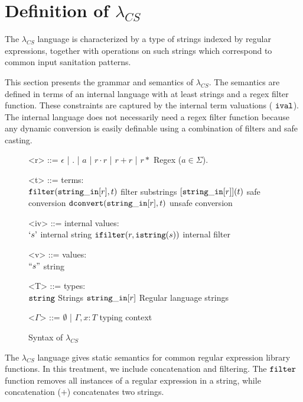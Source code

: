\documentclass[10pt,preprint]{sigplanconf}
\theoremstyle{definition}
\newcommand{\strin}{{\tt string\_in}}
\newcommand{\str}{ {\tt string} }
\newcommand{\istr}{ {\tt istring} }
\newcommand{\dconvert}[2]{ {\tt dconvert}(#1,#2) }
\newcommand{\filter}[2]{ {\tt filter}(#1,#2) }
\newcommand{\ival}{ \ {\tt ival} }
\newcommand{\istrf}[1]{`#1\textrm'} %
\newcommand{\strf}[1]{``#1"}
\newcommand{\lcs}{\lambda_{CS}}
\begin{document}
\section{Definition of $\lcs$}

The $\lcs$ language is characterized by a type of strings indexed by regular
expressions, together with operations on such strings which correspond to common
input sanitation patterns.

This section presents the grammar and semantics of $\lcs$.
The semantics are defined in terms of an internal language with at least strings and a regex filter function.
These constraints are captured by the internal term valuations ($\ival$).
The internal language does not necessarily need a regex filter function because
any dynamic conversion is easily definable using a combination of filters and safe
casting.

%
%
\begin{figure}
\begin{grammar}
<r> ::= $\epsilon$ | $.$ | $a$ | $r \cdot r$ | $r + r$ | $r*$ \hfill Regex ($a \in \Sigma$).

<t> ::= 			\hfill terms: 					\\
$\filter{\strin[r]}{t}$ 		\hfill filter substrings			\alt
$[\strin[r]](t)$ \hfill safe conversion \alt
$\dconvert{\strin[r]}{t}$ \hfill unsafe conversion

<iv> ::= 			\hfill internal values:					\\
$\istrf{s}$				\hfill internal string \alt
${\tt ifilter}(r, \istr(s))$ \hfill internal filter

<v> ::= \hfill values: \\
$\strf{s}$ \hfill string

<T> ::=				\hfill	types:					\\
$\str$  \hfill Strings \alt
$\strin[r]$				\hfill Regular language strings		

<$\Gamma$> ::=	$\emptyset$	 | $\Gamma,x:T$ \hfill typing context
\end{grammar}
\caption{Syntax of $\lcs$}
\label{fig:lcsSyntax}
\end{figure}

The $\lcs$ language gives static semantics for common regular expression library
functions. In this treatment, we include concatenation and filtering.
The ${\tt filter}$ function removes all instances of a regular expression in a string,
while concatenation ($+$) concatenates two strings.
\end{document}
